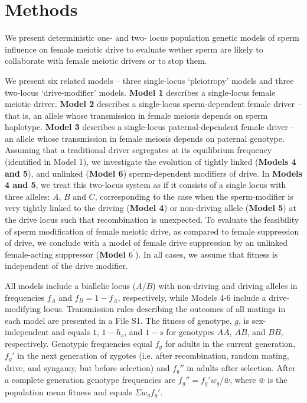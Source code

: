 \documentclass[12pt,letterpaper]{article}
\begin{document}
\section*{Methods}
We present deterministic one- and two- locus population genetic models of sperm influence on female meiotic drive to evaluate wether sperm are likely to collaborate with female meiotic drivers or to stop them. \newline 

We present six related models -- three single-locus `pleiotropy' models and three two-locus `drive-modifier' models.
	{\bf{Model 1}} describes a single-locus female meiotic driver.  
	{\bf{Model 2}} describes a single-locus sperm-dependent female driver -- that is, an allele whose transmission in female meiosis depends on sperm haplotype. 
	{\bf{Model 3}} describes a single-locus paternal-dependent female driver -- an allele whose transmission in female meiosis depends on paternal genotype. 
Assuming that a traditional driver segregates at its equilibrium frequency (identified in Model 1), 
	we investigate the evolution of tightly linked ({\bf{Models 4 and 5}}), and unlinked ({\bf{Model 6}}) 
	sperm-dependent modifiers of drive. 
In {\bf{Models 4 and 5}}, we treat this two-locus system as if it consists of
	a single locus with three alleles: $A$, $B$ and $C$, corresponding to the case when the
	sperm-modifier is very tightly linked to the driving ({\bf{Model 4}}) or non-driving allele ({\bf{Model 5}})
 	at the drive locus such that recombination is unexpected. 
To evaluate the feasibility of sperm modification of female meiotic drive, as compared to female suppression of drive, 
	we conclude with a model of female drive suppression by an unlinked female-acting suppressor ({\bf{Model $6^\prime$}}). 
In all cases, we assume that fitness is independent of the drive modifier. 
 \newline 

All models include a biallelic locus ($A/B$) with non-driving and driving alleles in frequencies $f_A$ and $f_B = 1 - f_A$, 
	respectively, while Models 4-6 include a drive-modifying locus.  
Transmission rules describing the outcomes of all matings in each model are presented in a File S1. 
The fitness of genotype, $g$, is sex-independent and equals $1$, $1-h_s$, and $1-s$ for genotypes $AA$, $AB$, and $BB$, respectively. %
Genotypic frequencies  equal  $f_g$ for adults in the current generation, 
	$f_g'$ in the next generation of zygotes (i.e. after recombination, random mating, drive, and syngamy, but before selection)
	and $f_g''$ in adults after selection. 
After a complete generation genotype frequencies are $f_g'' = f_g' w_g/\bar{w}$, where $\bar{w}$ is the population mean fitness and equals $\Sigma w_g f_g'$.  \newline
\end{document}
